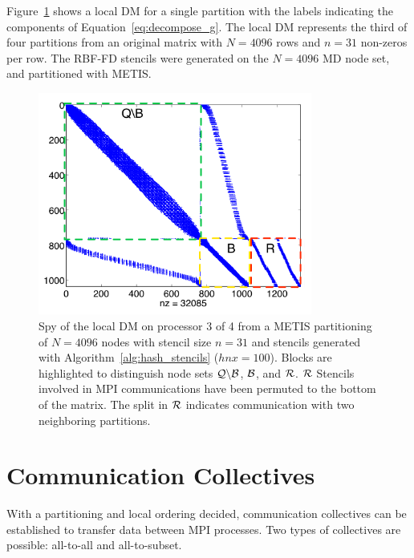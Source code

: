 \documentclass{report}
\begin{document}
Figure~\ref{fig:decomp_spy} shows a local DM for a single partition with the labels indicating the components of Equation~\ref{eq:decompose_g}. The local DM represents the third of four partitions from an original matrix with $N=4096$ rows and $n=31$ non-zeros per row. The RBF-FD stencils were generated on the $N=4096$ MD node set, and partitioned with METIS. 
\begin{figure}
\begin{center}
\includegraphics[width=9cm]{rbffd_methods_content/decompositions/spy_metis_stencil_example_labels.png}
\caption{Spy of the local DM on processor 3 of 4 from a METIS partitioning of $N=4096$ nodes with stencil size $n=31$ and stencils generated with Algorithm~\ref{alg:hash_stencils} ($hnx=100$). Blocks are highlighted to distinguish node sets $\mathcal{Q} \backslash \mathcal{B}$, $\mathcal{B}$, and $\mathcal{R}$. $\mathcal{R}$ Stencils involved in MPI communications have been permuted to the bottom of the matrix. The split in $\mathcal{R}$ indicates communication with two neighboring partitions. }
\label{fig:decomp_spy}
\end{center}
\end{figure}




\section{Communication Collectives}
\label{sec:mpi_collectives}

With a partitioning and local ordering decided, communication collectives can be established to transfer data between MPI processes. Two types of collectives are possible: all-to-all and all-to-subset. 
\end{document}

